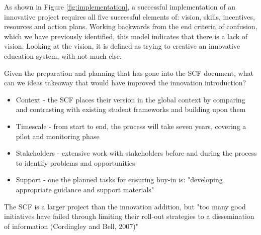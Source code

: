 As shown in Figure \ref{fig:implementation}, a successful implementation of an innovative project requires all five successful elements of: vision, skills, incentives, resources and action plans. Working backwards from the end criteria of confusion, which we have previously identified, this model indicates that there is a lack of vision. Looking at the vision, it is defined as trying to creative an innovative education system, with not much else.

Given the preparation and planning that has gone into the SCF document, what can we ideas takeaway that would have improved the innovation introduction?

\begin{itemize}
\item Context - the SCF places their version in the global context by comparing and contrasting with existing student frameworks and building upon them
\item Timescale - from start to end, the process will take seven years, covering a pilot and monitoring phase
\item Stakeholders - extensive work with stakeholders before and during the process to identify problems and opportunities
\item Support - one the planned tasks for ensuring buy-in is: "developing appropriate guidance and support materials"
\end{itemize}

The SCF is a larger project than the innovation addition, but "too many good initiatives have failed through limiting their roll-out strategies to a dissemination of information (Cordingley and Bell, 2007)" \cite{ADEC2016}

\theendnotes
